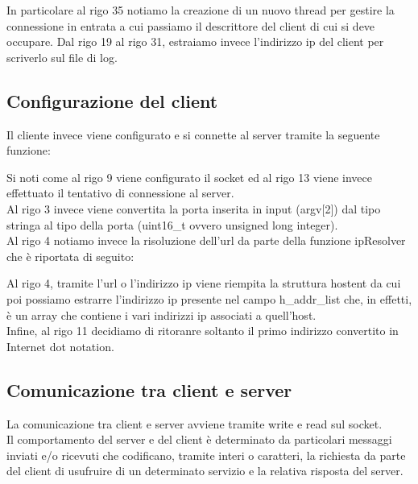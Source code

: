 \documentclass[a4paper]{article}
\begin{document}


In particolare al rigo 35 notiamo la creazione di un nuovo thread per gestire la connessione in entrata a cui passiamo il descrittore del client di cui si deve occupare.
Dal rigo 19 al rigo 31, estraiamo invece l'indirizzo ip del client per scriverlo sul file di log.

\subsection{Configurazione del client}
Il cliente invece viene configurato e si connette al server tramite la seguente funzione:


Si noti come al rigo 9 viene configurato il socket ed al rigo 13 viene invece effettuato il tentativo di connessione al server.\\
Al rigo 3 invece viene convertita la porta inserita in input (argv$[$2$]$) dal tipo stringa al tipo della porta (uint16\_t ovvero unsigned long integer).\\
Al rigo 4 notiamo invece la risoluzione dell'url da parte della funzione ipResolver che è riportata di seguito:

Al rigo 4, tramite l'url o l'indirizzo ip viene riempita la struttura hostent da cui poi possiamo estrarre l'indirizzo ip presente nel campo 
h\_addr\_list  che, in effetti, è un array che contiene i vari indirizzi ip associati a quell'host.\\
Infine, al rigo 11 decidiamo di ritoranre soltanto il primo indirizzo convertito in Internet dot notation.
\pagebreak
\subsection{Comunicazione tra client e server}
La comunicazione tra client e server avviene tramite write e read sul socket.\\
Il comportamento del server e del client è determinato da particolari messaggi inviati e/o ricevuti che codificano, tramite interi o caratteri, la richiesta da parte del client di usufruire di un determinato servizio e la relativa risposta del server.
\end{document}
